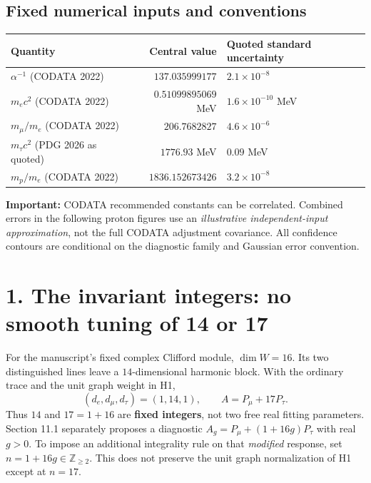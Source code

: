 \documentclass[10.5pt,a4paper]{article}
\newcommand{\me}{m_e}
\begin{document}
\subsection*{Fixed numerical inputs and conventions}
\begin{center}\small
\begin{tabular}{@{}lrl@{}}\toprule
Quantity & Central value & Quoted standard uncertainty\\\midrule
\(\alpha^{-1}\) (CODATA 2022) & \(137.035999177\) & \(2.1\times10^{-8}\)\\
\(\me c^2\) (CODATA 2022) & \(0.51099895069\) MeV & \(1.6\times10^{-10}\) MeV\\
\(m_\mu/\me\) (CODATA 2022) & \(206.7682827\) & \(4.6\times10^{-6}\)\\
\(m_\tau c^2\) (PDG 2026 as quoted) & \(1776.93\) MeV & \(0.09\) MeV\\
\(m_p/\me\) (CODATA 2022) & \(1836.152673426\) & \(3.2\times10^{-8}\)\\\bottomrule
\end{tabular}
\end{center}
\textbf{Important:} CODATA recommended constants can be correlated. Combined errors in the following proton figures use an \emph{illustrative independent-input approximation}, not the full CODATA adjustment covariance. All confidence contours are conditional on the diagnostic family and Gaussian error convention.

\clearpage
\section*{1. The invariant integers: no smooth tuning of 14 or 17}
For the manuscript's fixed complex Clifford module, \(\dim W=16\). Its two distinguished lines leave a \(14\)-dimensional harmonic block. With the ordinary trace and the unit graph weight in H1,
\[
 (d_e,d_\mu,d_\tau)=(1,14,1),\qquad A=P_\mu+17P_\tau.
\]
Thus \(14\) and \(17=1+16\) are \textbf{fixed integers}, not two free real fitting parameters. Section 11.1 separately proposes a diagnostic \(A_g=P_\mu+(1+16g)P_\tau\) with real \(g>0\). To impose an additional integrality rule on that \emph{modified} response, set \(n=1+16g\in\mathbb Z_{\ge2}\). This does not preserve the unit graph normalization of H1 except at \(n=17\).
\end{document}
